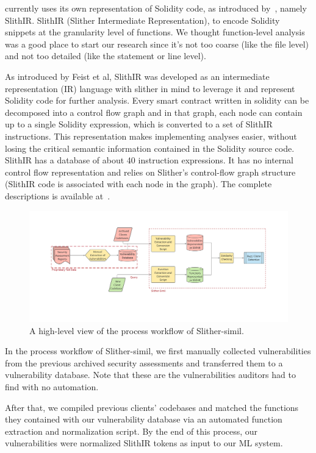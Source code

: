 \slithersimil currently uses its own representation of Solidity code, as introduced by~\cite{slither}, namely SlithIR.
SlithIR (Slither Intermediate Representation), to encode Solidity snippets at the granularity level of functions.
We thought function-level analysis was a good place to start our research since
it's not too coarse (like the file level) and not too detailed (like the statement or line level).

As introduced by Feist et al, SlithIR was developed as an intermediate representation (IR) language with slither in mind to leverage it and represent Solidity code for further analysis.
Every smart contract written in solidity can be decomposed into a control flow graph and in that graph, each node can contain up to a single Solidity expression, which is converted to a set of SlithIR instructions.
This representation makes implementing analyses easier, without losing the critical semantic information contained in the Solidity source code.~\cite{slither}
SlithIR has a database of about 40 instruction expressions.
It has no internal control flow representation and relies on Slither's control-flow graph structure (SlithIR code is associated with each node in the graph).
The complete descriptions is available at~\cite{slithir}.

\begin{figure}
  \centering
  \includegraphics[width=\textwidth]{figures/slitherS.png}
  \caption{A high-level view of the process workflow of Slither-simil.}
  \label{fig:slithersimilhighlevel}
\end{figure}

In the process workflow of Slither-simil, we first manually collected vulnerabilities from the previous archived security assessments and transferred them to a vulnerability database.
Note that these are the vulnerabilities auditors had to find with no automation.

After that, we compiled previous clients' codebases and matched the functions they contained with our vulnerability database via an automated function extraction and normalization script.
By the end of this process, our vulnerabilities were normalized SlithIR tokens as input to our ML system.

